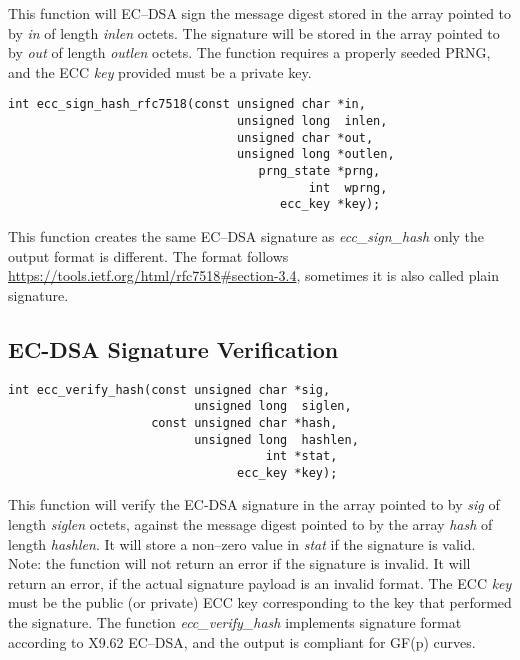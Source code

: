 \documentclass[synpaper]{book}
\begin{document}
This function will EC--DSA sign the message digest stored in the array pointed to by \textit{in} of length \textit{inlen} octets.  The signature
will be stored in the array pointed to by \textit{out} of length \textit{outlen} octets.  The function requires a properly seeded PRNG, and
the ECC \textit{key} provided must be a private key.

\begin{verbatim}
int ecc_sign_hash_rfc7518(const unsigned char *in,
                                unsigned long  inlen,
                                unsigned char *out,
                                unsigned long *outlen,
                                   prng_state *prng,
                                          int  wprng,
                                      ecc_key *key);
\end{verbatim}

This function creates the same EC--DSA signature as \textit{ecc\_sign\_hash} only the output format is different.
The format follows \url{https://tools.ietf.org/html/rfc7518#section-3.4}, sometimes it is also called plain signature.

\subsection{EC-DSA Signature Verification}
\begin{verbatim}
int ecc_verify_hash(const unsigned char *sig,
                          unsigned long  siglen,
                    const unsigned char *hash,
                          unsigned long  hashlen,
                                    int *stat,
                                ecc_key *key);
\end{verbatim}

This function will verify the EC-DSA signature in the array pointed to by \textit{sig} of length \textit{siglen} octets, against the message digest
pointed to by the array \textit{hash} of length \textit{hashlen}.  It will store a non--zero value in \textit{stat} if the signature is valid.  Note:
the function will not return an error if the signature is invalid.  It will return an error, if the actual signature payload is an invalid format.
The ECC \textit{key} must be the public (or private) ECC key corresponding to the key that performed the signature.
The function \textit{ecc\_verify\_hash} implements signature format according to X9.62 EC--DSA, and the output is compliant for GF(p) curves.
\end{document}

